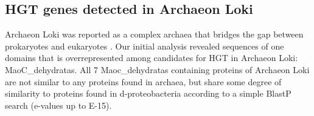 \subsection{HGT genes detected in Archaeon Loki}
Archaeon Loki was reported as a complex archaea that bridges the gap between
prokaryotes and eukaryotes \cite{Spang2015}. Our initial analysis revealed
sequences of one domains that is overrepresented among candidates for HGT in
Archaeon Loki: MaoC\_dehydratas. All 7 Maoc\_dehydratas containing proteins of
Archaeon Loki are not similar to any proteins found in archaea, but share some
degree of similarity to proteins found in d-proteobacteria according to a
simple BlastP search (e-values up to E-15).
